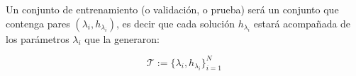 Un conjunto de entrenamiento (o validación, o prueba) será un conjunto que contenga pares $(\lambda_i, h_{\lambda_i})$, es decir que cada solución $h_{\lambda_i}$ estará acompañada de los parámetros $\lambda_i$ que la generaron:

\[
\mathcal{T} := \{ \lambda_i, h_{\lambda_i} \}_{i=1}^N
\]





